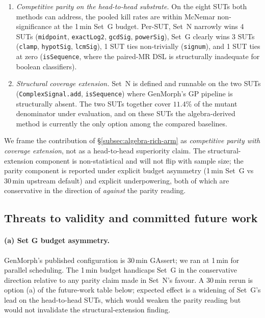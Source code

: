 \begin{enumerate}[nosep,leftmargin=*]
  \item \emph{Competitive parity on the head-to-head substrate.} On
        the eight SUTs both methods can address, the pooled kill
        rates are within McNemar non-significance at the 1\,min
        Set~G budget. Per-SUT, Set~N narrowly wins 4 SUTs
        (\texttt{midpoint}, \texttt{exactLog2}, \texttt{gcdSig},
        \texttt{powerSig}), Set~G clearly wins 3 SUTs
        (\texttt{clamp}, \texttt{hypotSig}, \texttt{lcmSig}), 1 SUT
        ties non-trivially (\texttt{signum}), and 1 SUT ties at zero
        (\texttt{isSequence}, where the paired-MR DSL is
        structurally inadequate for boolean classifiers).
  \item \emph{Structural coverage extension.} Set~N is defined and
        runnable on the two SUTs (\texttt{ComplexSignal.add},
        \texttt{isSequence}) where GenMorph's GP pipeline is
        structurally absent. The two SUTs together cover $11.4\%$
        of the mutant denominator under evaluation, and on these
        SUTs the algebra-derived method is currently the only
        option among the compared baselines.
\end{enumerate}

We frame the contribution of \S\ref{subsec:algebra-rich-arm} as
\emph{competitive parity with coverage extension}, not as a
head-to-head superiority claim. The structural-extension component is
non-statistical and will not flip with sample size; the parity
component is reported under explicit budget asymmetry (1\,min Set~G
vs 30\,min upstream default) and explicit underpowering, both of
which are conservative in the direction of \emph{against} the parity
reading.

\subsection{Threats to validity and committed future work}
\label{subsec:empirical-threats}

\paragraph{(a) Set G budget asymmetry.}
GenMorph's published configuration is 30\,min GAssert; we ran at
1\,min for parallel scheduling. The 1\,min budget handicaps Set~G in
the conservative direction relative to any parity claim made in
Set~N's favour. A 30\,min rerun is option (a) of the future-work
table below; expected effect is a widening of Set~G's lead on the
head-to-head SUTs, which would weaken the parity reading but would
not invalidate the structural-extension finding.

